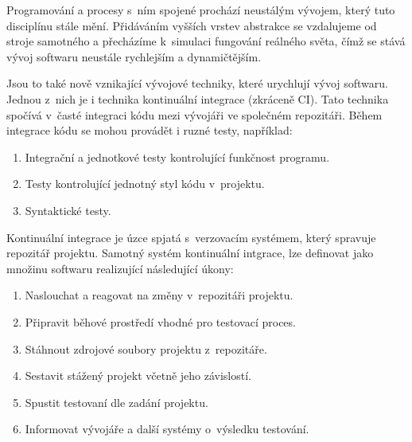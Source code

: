 \begin{introduction}

Programování a procesy s~ním spojené prochází neustálým vývojem, který tuto disciplínu stále mění. 
Přidáváním vyšších vrstev abstrakce se vzdalujeme od stroje samotného a přecházíme k~simulaci fungování reálného světa, čímž se stává vývoj softwaru neustále rychlejším a dynamičtějším. 

Jsou to také nově vznikající vývojové techniky, které urychlují vývoj softwaru.
Jednou z~nich je i technika kontinuální integrace (zkráceně CI).
Tato technika spočívá v~časté integraci kódu mezi vývojáři ve společném repozitáři.
Během integrace kódu se mohou provádět i ruzné testy, například:

\begin{enumerate}
	\item Integrační a jednotkové testy kontrolující funkčnost programu.
	\item Testy kontrolující jednotný styl kódu v~projektu.
	\item Syntaktické testy.
\end{enumerate}

Kontinuální integrace je úzce spjatá s~verzovacím systémem, který spravuje repozitář projektu.
Samotný systém kontinuální intgrace, lze definovat jako množinu softwaru realizující následující úkony:

\begin{enumerate}
	\item Naslouchat a reagovat na změny v~repozitáři projektu.
	\item Připravit běhové prostředí vhodné pro testovací proces.
	\item Stáhnout zdrojové soubory projektu z~repozitáře.
	\item Sestavit stážený projekt včetně jeho závislostí.
	\item Spustit testovaní dle zadání projektu.
	\item Informovat vývojáře a další systémy o~výsledku testování.
\end{enumerate}

\end{introduction}
